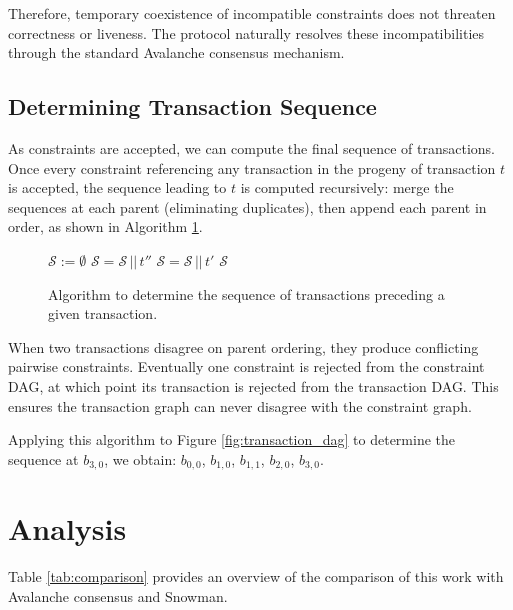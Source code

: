 \documentclass[12pt]{article}
\begin{document}
Therefore, temporary coexistence of incompatible constraints does not threaten
correctness or liveness. The protocol naturally resolves these
incompatibilities through the standard Avalanche consensus mechanism.

\subsection{Determining Transaction Sequence}
As constraints are accepted, we can compute the final sequence of transactions.
Once every constraint referencing any transaction in the progeny of transaction
$t$ is accepted, the sequence leading to $t$ is computed recursively: merge the
sequences at each parent (eliminating duplicates), then append each parent in
order, as shown in Algorithm \ref{alg:sequencing}.

\begin{figure}
\begin{algorithmic}[1]
      \State $\mathcal{S} := \emptyset$
          \State $\mathcal{S} = \mathcal{S} \,||\, t''$
        \EndFor
      \EndFor
          \State $\mathcal{S} = \mathcal{S} \,||\, t'$
      \EndFor
      \State \Return $\mathcal{S}$
    \EndProcedure
\end{algorithmic}
\caption{Algorithm to determine the sequence of transactions preceding a given transaction.} \label{alg:sequencing}
\end{figure}

When two transactions disagree on parent ordering, they produce conflicting
pairwise constraints. Eventually one constraint is rejected from the constraint
DAG, at which point its transaction is rejected from the transaction DAG. This
ensures the transaction graph can never disagree with the constraint graph.

Applying this algorithm to Figure \ref{fig:transaction_dag} to determine the
sequence at $b_{3,0}$, we obtain: $b_{0,0}$, $b_{1,0}$, $b_{1,1}$, $b_{2,0}$,
$b_{3,0}$.

\section{Analysis}
Table \ref{tab:comparison} provides an overview of the comparison of this work
with Avalanche consensus and Snowman.
\end{document}
